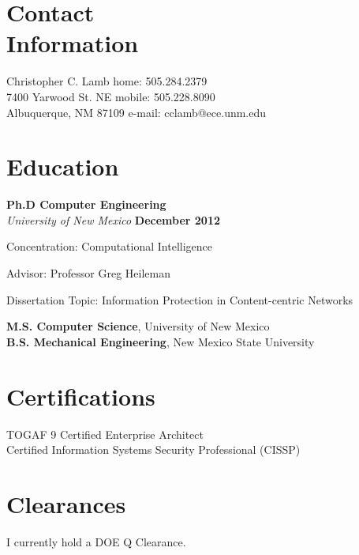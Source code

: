 \documentclass[margin,line]{resume}
\begin{document}
\begin{resume}

\section{\mysidestyle Contact\\Information}
Christopher C. Lamb							\hfill home: 505.284.2379				\vspace{0mm}\\\vspace{0mm}%
7400 Yarwood St. NE							\hfill mobile: 505.228.8090 		\vspace{0mm}\\\vspace{0mm}%
Albuquerque, NM 87109						\hfill e-mail: cclamb@ece.unm.edu		  	\vspace{0mm}\\\vspace{-4.5mm}%

\section{\mysidestyle Education}

\textbf{Ph.D Computer Engineering} \\
\textsl{University of New Mexico} \hfill \textbf{ December 2012 } \\\vspace{-3mm}%
\begin{list2}
\item Concentration: Computational Intelligence
\item Advisor:  Professor Greg Heileman
\item Dissertation Topic: Information Protection in Content-centric Networks
\end{list2}
{\bf M.S. Computer Science}, University of New Mexico \\
{\bf B.S. Mechanical Engineering}, New Mexico State University

\section{\mysidestyle Certifications}
TOGAF 9 Certified Enterprise Architect \\
Certified Information Systems Security Professional (CISSP)

\section{\mysidestyle Clearances}
I currently hold a DOE Q Clearance.


\end{resume}
\end{document}
